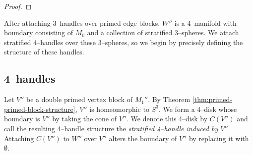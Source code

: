\begin{proof}
%
%
%
%	
%	
%	
\end{proof}

After attaching 3--handles over primed edge blocks, $W''$ is a 4--manifold with boundary consisting of $M_0$ and a collection of stratified 3--spheres.
We attach stratified 4--handles over these 3--spheres, so we begin by precisely defining the structure of these handles.

\subsection{4--handles}
Let $V''$ be a double primed vertex block of $M_1''$.
By Theorem \ref{thm:primed-primed-block-structure}, $V''$ is homeomorphic to $S^3$.
We form a 4--disk whose boundary is $V''$ by taking the cone of $V''$.
We denote this 4--disk by $C(V'')$ and call the resulting 4--handle structure the \emph{stratified 4--handle induced by $V''$}.
Attaching $C(V'')$ to $W''$ over $V''$ alters the boundary of $V''$ by replacing it with $\emptyset$.

